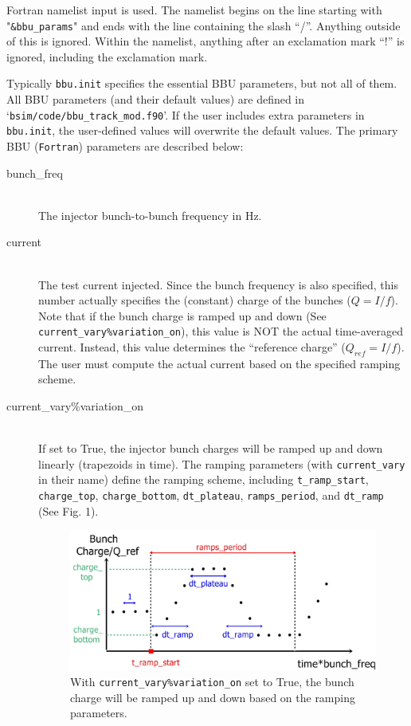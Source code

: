 \documentclass{hitec}
\newcommand{\Newline}{\hfil \\}
\begin{document}
Fortran namelist input is used. The namelist begins on the line starting with "\texttt{\&bbu_params}"
and ends with the line containing the slash ``/''. Anything outside of this is ignored. Within the
namelist, anything after an exclamation mark ``!'' is ignored, including the exclamation mark.
 
Typically \texttt{bbu.init} specifies the essential BBU parameters, but not all of them. All BBU parameters (and their default values) are defined in `\texttt{bsim/code/bbu_track_mod.f90}'. If the user includes extra parameters in \texttt{bbu.init}, the user-defined values will overwrite the default values.
The primary BBU (\texttt{Fortran}) parameters are described below:

\begin{description}
\item[bunch_freq] \Newline
The injector bunch-to-bunch frequency in Hz.
%
\item[current] \Newline
The test current injected. Since the bunch frequency is also specified, this number actually specifies the (constant) charge of the bunches ($Q = I/f$). Note that if the bunch charge is ramped up and down (See \texttt{current_vary\%variation_on}), this value is NOT the actual time-averaged current. Instead, this value determines the ``reference charge'' ($Q_{ref} = I/f$). The user must compute the actual current based on the specified ramping scheme. 
%
\item[current_vary\%variation_on] \Newline
If set to True, the injector bunch charges will be ramped up and down linearly (trapezoids in time). The ramping parameters (with \texttt{current_vary} in their name) define the ramping scheme, including \texttt{t_ramp_start}, \texttt{charge_top}, \texttt{charge_bottom}, \texttt{dt_plateau}, \texttt{ramps_period}, and \texttt{dt_ramp} (See Fig. 1). 

\begin{figure}[h]
\includegraphics[scale=0.4]{BBU_code_description_ramping}
\caption{ With \texttt{current_vary\%variation_on} set to True, the bunch charge will be ramped up and down based on the ramping parameters.}
\label{setup1}
\end{figure}


\end{description}
\end{document}
